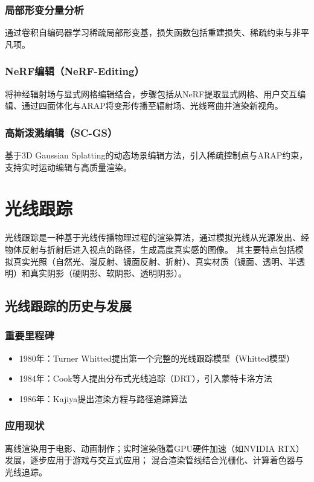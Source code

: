 \documentclass[12pt]{article}
\begin{document}
\subsubsection*{局部形变分量分析}
通过卷积自编码器学习稀疏局部形变基，损失函数包括重建损失、稀疏约束与非平凡项。

\subsubsection*{NeRF编辑（NeRF-Editing）}
将神经辐射场与显式网格编辑结合，步骤包括从NeRF提取显式网格、用户交互编辑、通过四面体化与ARAP将变形传播至辐射场、光线弯曲并渲染新视角。

\subsubsection*{高斯泼溅编辑（SC-GS）}
基于3D Gaussian Splatting的动态场景编辑方法，引入稀疏控制点与ARAP约束，支持实时运动编辑与高质量渲染。

\newpage

\section{光线跟踪}


光线跟踪是一种基于光线传播物理过程的渲染算法，通过模拟光线从光源发出、经物体反射与折射后进入视点的路径，生成高度真实感的图像。
其主要特点包括模拟真实光照（自然光、漫反射、镜面反射、折射）、真实材质（镜面、透明、半透明）和真实阴影（硬阴影、软阴影、透明阴影）。

\subsection{光线跟踪的历史与发展}

\subsubsection*{重要里程碑}
\begin{itemize}
    \item 1980年：Turner Whitted提出第一个完整的光线跟踪模型（Whitted模型）
    \item 1984年：Cook等人提出分布式光线追踪（DRT），引入蒙特卡洛方法
    \item 1986年：Kajiya提出渲染方程与路径追踪算法
\end{itemize}

\subsubsection*{应用现状}
离线渲染用于电影、动画制作；实时渲染随着GPU硬件加速（如NVIDIA RTX）发展，逐步应用于游戏与交互式应用；
混合渲染管线结合光栅化、计算着色器与光线追踪。
\end{document}

